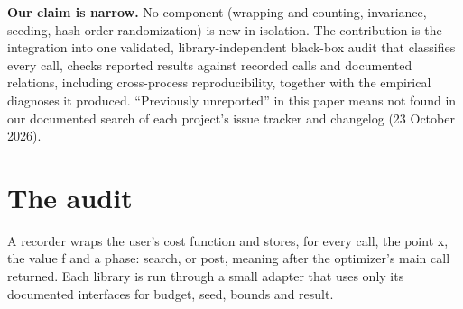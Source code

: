 \documentclass[acmsmall,screen,review,anonymous=false]{acmart}
\begin{document}
\textbf{Our claim is narrow.} No component (wrapping and counting, invariance, seeding, hash-order randomization) is new
in isolation. The contribution is the integration into one validated, library-independent black-box audit that
classifies every call, checks reported results against recorded calls and documented relations, including
cross-process reproducibility, together with the empirical diagnoses it produced. ``Previously unreported'' in this
paper means not found in our documented search of each project's issue tracker and changelog (23 October 2026).

\section{The audit}\label{the-audit}

A recorder wraps the user's cost function and stores, for every call, the point x, the value f and a phase: search,
or post, meaning after the optimizer's main call returned. Each library is run through a small adapter that uses only
its documented interfaces for budget, seed, bounds and result.
\end{document}
